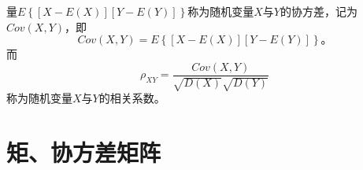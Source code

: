 \begin{definition}
	量$ E\left\lbrace [X-E(X)][Y-E(Y)] \right\rbrace $称为随机变量$ X $与$ Y $的协方差，记为$ Cov(X, Y) $，即
	\begin{equation}
		Cov(X,Y)=E\left\lbrace [X-E(X)][Y-E(Y)] \right\rbrace \text{。}
	\end{equation}
	而
	\begin{equation}
		\rho_{XY} = \frac{Cov(X, Y)}{\sqrt{D(X)}\sqrt{D(Y)}}
	\end{equation}
	称为随机变量$ X $与$ Y $的相关系数。
\end{definition}

\section{矩、协方差矩阵}